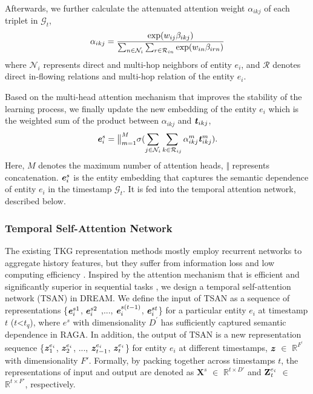 \documentclass[sigconf,natbib=true]{acmart}
\begin{document}
Afterwards, we further  calculate the attenuated attention weight  $\alpha_{ikj} $  of each triplet in $\mathcal{G}_t$, 
\begin{equation}
	\alpha_{ikj} = \frac{\rm{exp}(\emph{$ w_{ij} \beta_{ikj}$})}{\sum\nolimits_{n \in \mathcal{N}_i}\sum\nolimits_{r \in \mathcal{R}_{in}}\rm{exp}(\emph{$w_{in} \beta_{irn}$})}
\end{equation}
where $\mathcal{N}_i$ represents direct and multi-hop neighbors of entity $e_i$, and $\mathcal{R}$  denotes direct in-flowing relations and multi-hop relation of the entity $e_i$. 

Based on the multi-head attention mechanism that improves the stability of the learning process, we finally update the new embedding of the entity $e_i$  which is the weighted sum of the product between $\alpha_{ikj}$ and $\textbf{\emph{t}}_{ikj}$, 
\begin{equation}
  \textbf{\emph{e}}_i^{s} =  \big \Vert^M_{m=1} \sigma ( \sum\limits_{j \in \mathcal{N}_i }\sum\limits_{k \in \mathcal{R}_{ij}}\alpha_{ikj}^{m} \textbf{\emph{t}}_{ikj}^{m}). 
\end{equation}
Here, $M$ denotes the maximum number of attention heads, $\Vert$ represents concatenation.  $\textbf{\emph{e}}_i^{s}$ is the entity embedding that captures the semantic  dependence of entity $e_i$ in the timestamp $\mathcal{G}_t$. It is fed into the temporal attention network, described below. %



\subsubsection{Temporal Self-Attention Network}
The existing TKG representation methods mostly employ recurrent networks to aggregate history features, but they suffer from information loss and low computing efficiency \cite{attengraph}.  Inspired by the attention mechanism that is efficient and significantly superior in sequential tasks \cite{attention}, we design a temporal self-attention network (TSAN) in DREAM. We define the input of TSAN as a sequence of representations \{$\textbf{\emph{e}}_{i}^{s1}$, $\textbf{\emph{e}}_{i}^{s2}$ ,..., $\textbf{\emph{e}}_{i}^{s(t-1)}$, $\textbf{\emph{e}}_{i}^{st}$\} for a particular entity $e_i$ at timestamp $t$ ($t$<$t_q$), where $e^{s}$ with dimensionality $D^{'}$ has sufficiently captured semantic dependence in RAGA. In addition, the output of TSAN is a new representation sequence \{$\textbf{\emph{z}}^{e_i}_1$, $\textbf{\emph{z}}^{e_i}_2$, ..., $\textbf{\emph{z}}^{e_i}_{t-1}$, $\textbf{\emph{z}}^{e_i}_t$\} for entity $e_i$ at different timestamps, $\textbf{\emph{z}}$ $\in$ $\mathbb{R}^{F^{'}}$ with dimensionality $F'$. Formally, by packing together across timestamps $t$, the representations of input and output are denoted as $\textbf{X}^s$ $\in$ $\mathbb{R}^{t \times D'}$ and $\textbf{Z}_{\emph{t}}^{e_i}$ $\in$ $\mathbb{R}^{t \times F'}$, respectively.  
\end{document}
